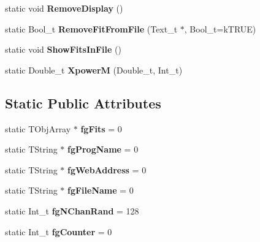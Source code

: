 \begin{DoxyCompactItemize}
\item 
\hypertarget{classTSplineFit_a81be2932f031b3014989827b6c70196d}{static void {\bfseries Remove\-Display} ()}\label{classTSplineFit_a81be2932f031b3014989827b6c70196d}

\item 
\hypertarget{classTSplineFit_a49f38b73b643d7a6093e140863be10ca}{static Bool\-\_\-t {\bfseries Remove\-Fit\-From\-File} (Text\-\_\-t $\ast$, Bool\-\_\-t=k\-T\-R\-U\-E)}\label{classTSplineFit_a49f38b73b643d7a6093e140863be10ca}

\item 
\hypertarget{classTSplineFit_ae93a04f8bcc1445995b45304ad4fac60}{static void {\bfseries Show\-Fits\-In\-File} ()}\label{classTSplineFit_ae93a04f8bcc1445995b45304ad4fac60}

\item 
\hypertarget{classTSplineFit_ac5634a12c11d23d272498e0065af9725}{static Double\-\_\-t {\bfseries Xpower\-M} (Double\-\_\-t, Int\-\_\-t)}\label{classTSplineFit_ac5634a12c11d23d272498e0065af9725}

\end{DoxyCompactItemize}
\subsection*{Static Public Attributes}
\begin{DoxyCompactItemize}
\item 
\hypertarget{classTSplineFit_aece868923fa0c00f09828f92b7ba22ff}{static T\-Obj\-Array $\ast$ {\bfseries fg\-Fits} = 0}\label{classTSplineFit_aece868923fa0c00f09828f92b7ba22ff}

\item 
\hypertarget{classTSplineFit_a78569a7c71ace9f8078b77c65dcf31f5}{static T\-String $\ast$ {\bfseries fg\-Prog\-Name} = 0}\label{classTSplineFit_a78569a7c71ace9f8078b77c65dcf31f5}

\item 
\hypertarget{classTSplineFit_a905e6ab3e4c39b3a02e0920a909ad65e}{static T\-String $\ast$ {\bfseries fg\-Web\-Address} = 0}\label{classTSplineFit_a905e6ab3e4c39b3a02e0920a909ad65e}

\item 
\hypertarget{classTSplineFit_a4b625d3f44c3c79bb152196fba32852f}{static T\-String $\ast$ {\bfseries fg\-File\-Name} = 0}\label{classTSplineFit_a4b625d3f44c3c79bb152196fba32852f}

\item 
\hypertarget{classTSplineFit_abb0f4b726e7642b1e1322b698221bf0d}{static Int\-\_\-t {\bfseries fg\-N\-Chan\-Rand} = 128}\label{classTSplineFit_abb0f4b726e7642b1e1322b698221bf0d}

\item 
\hypertarget{classTSplineFit_aff9679956135672c33a5af87d48488a3}{static Int\-\_\-t {\bfseries fg\-Counter} = 0}\label{classTSplineFit_aff9679956135672c33a5af87d48488a3}

\end{DoxyCompactItemize}
